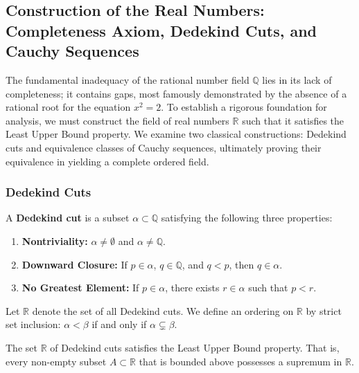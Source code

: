 \subsection{Construction of the Real Numbers: Completeness Axiom, Dedekind Cuts, and Cauchy Sequences}

The fundamental inadequacy of the rational number field $\mathbb{Q}$ lies in its lack of completeness; it contains gaps, most famously demonstrated by the absence of a rational root for the equation $x^2 = 2$. To establish a rigorous foundation for analysis, we must construct the field of real numbers $\mathbb{R}$ such that it satisfies the Least Upper Bound property. We examine two classical constructions: Dedekind cuts and equivalence classes of Cauchy sequences, ultimately proving their equivalence in yielding a complete ordered field.

\subsubsection{Dedekind Cuts}

\begin{definition}
A \textbf{Dedekind cut} is a subset $\alpha \subset \mathbb{Q}$ satisfying the following three properties:
\begin{enumerate}
    \item \textbf{Nontriviality:} $\alpha \neq \emptyset$ and $\alpha \neq \mathbb{Q}$.
    \item \textbf{Downward Closure:} If $p \in \alpha$, $q \in \mathbb{Q}$, and $q < p$, then $q \in \alpha$.
    \item \textbf{No Greatest Element:} If $p \in \alpha$, there exists $r \in \alpha$ such that $p < r$.
\end{enumerate}
\end{definition}

Let $\mathbb{R}$ denote the set of all Dedekind cuts. We define an ordering on $\mathbb{R}$ by strict set inclusion: $\alpha < \beta$ if and only if $\alpha \subsetneq \beta$.

\begin{theorem}
The set $\mathbb{R}$ of Dedekind cuts satisfies the Least Upper Bound property. That is, every non-empty subset $A \subset \mathbb{R}$ that is bounded above possesses a supremum in $\mathbb{R}$.
\end{theorem}

